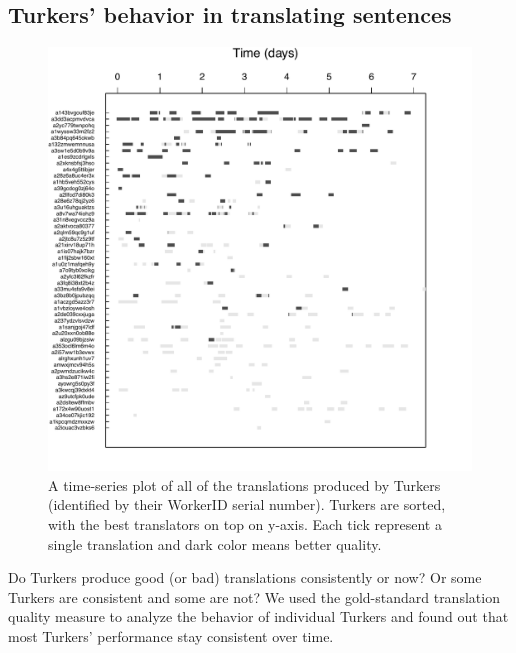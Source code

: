 \documentclass[11pt,letterpaper]{article}
\begin{document}

\subsection{Turkers' behavior in translating sentences}



\begin{figure}[h!]
  \centering
  \includegraphics[width=\linewidth]{WorkerPerf/wp.pdf}
  \caption{A time-series plot of all of the translations produced by Turkers (identified by their WorkerID serial number). Turkers are sorted, with the best translators on top on y-axis. Each tick represent a single translation and dark color means better quality.
}
    \label{fworkerperf}
\end{figure}

Do Turkers produce good (or bad) translations consistently or now? Or some Turkers are consistent and some are not? We used the gold-standard translation quality measure to analyze the behavior of individual Turkers and found out that most Turkers' performance stay consistent over time. 
\end{document}
